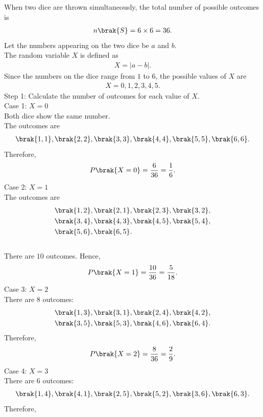 \begin{enumerate}[label=\thesubsection.\arabic*, ref=\thesubsection.\theenumi]
\solution
When two dice are thrown simultaneously, the total number of possible
outcomes is
\begin{align}
n\brak{S}=6\times 6=36.
\end{align}
Let the numbers appearing on the two dice be $a$ and $b$.
\\The random variable $X$ is defined as
\begin{align}
X=|a-b|.
\end{align}
Since the numbers on the dice range from $1$ to $6$, the possible
values of $X$ are
\begin{align}
X=0,1,2,3,4,5.
\end{align}
{Step 1: Calculate the number of outcomes for each value of $X$.}
\\{Case 1: $X=0$}
\\Both dice show the same number.
\\The outcomes are
\begin{align}
\brak{1,1},\brak{2,2},\brak{3,3},\brak{4,4},\brak{5,5},\brak{6,6}.
\end{align}
Therefore,
\begin{align}
P\brak{X=0}=\frac{6}{36}=\frac{1}{6}.
\end{align}
{Case 2: $X=1$}
\\The outcomes are
\begin{align}
&\brak{1,2},\brak{2,1},\brak{2,3},\brak{3,2},\\
&\brak{3,4},\brak{4,3},\brak{4,5},\brak{5,4},\\
&\brak{5,6},\brak{6,5}.
\end{align}
\\There are $10$ outcomes. Hence,
\begin{align}
P\brak{X=1}=\frac{10}{36}=\frac{5}{18}.
\end{align}
{Case 3: $X=2$}
\\There are $8$ outcomes:
\begin{align}
&\brak{1,3},\brak{3,1},\brak{2,4},\brak{4,2},\\
&\brak{3,5},\brak{5,3},\brak{4,6},\brak{6,4}.
\end{align}
Therefore,
\begin{align}
P\brak{X=2}=\frac{8}{36}=\frac{2}{9}.
\end{align}
{Case 4: $X=3$}
\\There are $6$ outcomes:
\begin{align}
\brak{1,4},\brak{4,1},\brak{2,5},\brak{5,2},\brak{3,6},\brak{6,3}.
\end{align}
Therefore,

\end{enumerate}
